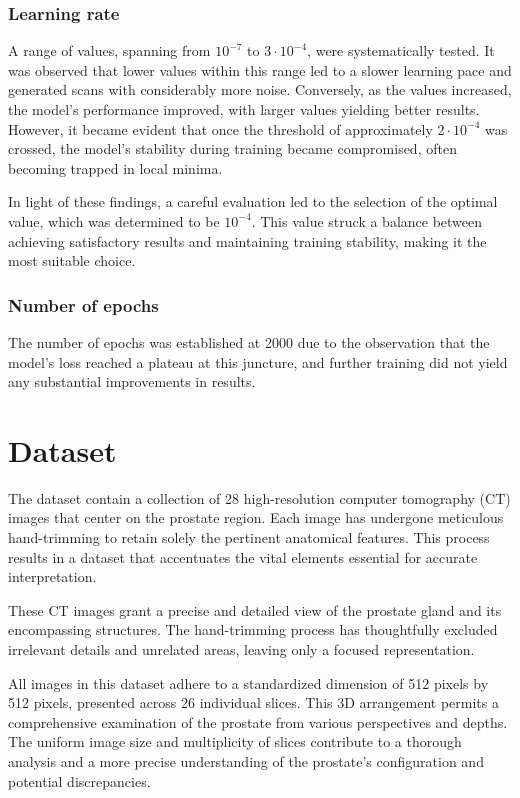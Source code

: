\documentclass[11pt,a4paper]{report}
\begin{document}
\subsubsection{Learning rate}
A range of values, spanning from $10^{-7}$ to $3\cdot10^{-4}$, were systematically tested. It was observed that lower values within this range led to a slower learning pace and generated scans with considerably more noise. Conversely, as the values increased, the model's performance improved, with larger values yielding better results. However, it became evident that once the threshold of approximately $2\cdot10^{-4}$ was crossed, the model's stability during training became compromised, often becoming trapped in local minima.

In light of these findings, a careful evaluation led to the selection of the optimal value, which was determined to be $10^{-4}$. This value struck a balance between achieving satisfactory results and maintaining training stability, making it the most suitable choice.
\subsubsection{Number of epochs}
The number of epochs was established at 2000 due to the observation that the model's loss reached a plateau at this juncture, and further training did not yield any substantial improvements in results.


\section{Dataset}
The dataset contain a collection of 28 high-resolution computer tomography (CT) images that center on the prostate region. Each image has undergone meticulous hand-trimming to retain solely the pertinent anatomical features. This process results in a dataset that accentuates the vital elements essential for accurate interpretation.

These CT images grant a precise and detailed view of the prostate gland and its encompassing structures. The hand-trimming process has thoughtfully excluded irrelevant details and unrelated areas, leaving only a focused representation.

All images in this dataset adhere to a standardized dimension of 512 pixels by 512 pixels, presented across 26 individual slices. This 3D arrangement permits a comprehensive examination of the prostate from various perspectives and depths. The uniform image size and multiplicity of slices contribute to a thorough analysis and a more precise understanding of the prostate's configuration and potential discrepancies.
\end{document}
